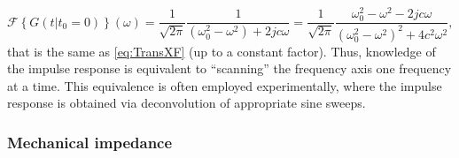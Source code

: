 \documentclass[11pt,twoside,a4paper,english]{book}
\newcommand{\virg}[1]{``#1''}
\begin{document}
\begin{equation}
    \mathcal{F}\left\{G(t|t_0=0)\right\}(\omega) = \frac{1}{\sqrt{2\pi}}\frac{1}{(\omega_0^2-\omega^2)+2jc\omega} = \frac{1}{\sqrt{2\pi}}\frac{\omega_0^2-\omega^2-2jc\omega}{(\omega_0^2-\omega^2)^2+4c^2\omega^2},
\end{equation}
that is the same as \eqref{eq:TransXF} (up to a constant factor). Thus, knowledge of the impulse response is equivalent to \virg{scanning} the frequency axis one frequency at a time. This equivalence is often employed experimentally, where the impulse response is obtained via deconvolution of appropriate sine sweeps.


\subsubsection{Mechanical impedance}
\end{document}
